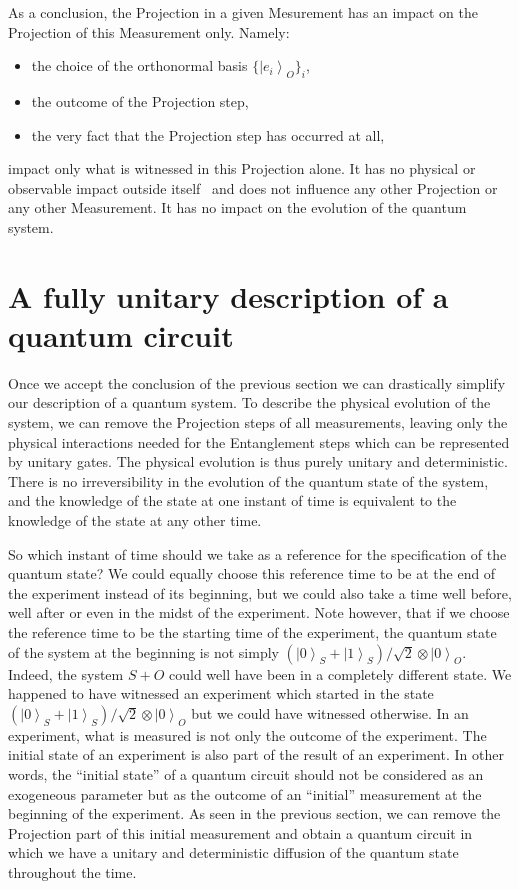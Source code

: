 \documentclass[11pt,amsmath,amssymb,latexsym,a4paper]{article}
\newcommand{\ketBasis}[2]{\left|{#1}\right>_{#2}}
\begin{document}
As a conclusion, the Projection in a given Mesurement has an impact on the Projection of this Measurement only. Namely:
\begin{itemize}
\item the choice of the orthonormal basis  $\{\ketBasis{e_i}{O}\}_i$,
\item the outcome of the Projection step,
\item the very fact that the Projection step has occurred at all,
\end{itemize}
impact only what is witnessed in this Projection alone. It has no physical or observable impact outside itself~\cite{Inamori} and does not influence any other Projection or any other Measurement. It has no impact on the evolution of the quantum system.



\section{A fully unitary description of a quantum circuit}

Once we accept the conclusion of the previous section we can drastically simplify our description of a quantum system. To describe the physical evolution of the system, we can remove the Projection steps of all measurements, leaving only the physical interactions needed for the Entanglement steps which can be represented by unitary gates. 
The physical evolution is thus purely unitary and deterministic. There is no irreversibility in the evolution of the quantum state of the system, and the knowledge of the state at one instant of time is equivalent to the knowledge of the state at any other time. 

So which instant of time should we take as a reference for the specification of the quantum state? We could equally choose this reference time to be at the end of the experiment instead of its beginning, but we could also take a time well before, well after or even in the midst of the experiment. Note however, that if we choose the reference time to be the starting time of the experiment, the quantum state of the system at the beginning is not simply $(\ketBasis{0}{S}+\ketBasis{1}{S})/\sqrt{2}\otimes\ketBasis{0}{O}$. Indeed, the system $S+O$ could well have been in a completely different state. We happened to have witnessed an experiment which started in the state $(\ketBasis{0}{S}+\ketBasis{1}{S})/\sqrt{2}\otimes\ketBasis{0}{O}$ but we could have witnessed otherwise. In an experiment, what is measured is not only the outcome of the experiment. The initial state of an experiment is also part of the result of an experiment.
In other words, the ``initial state'' of a quantum circuit should not be considered as an exogeneous parameter but as the outcome of an ``initial'' measurement at the beginning of the experiment.  As seen in the previous section, we can remove the Projection part of this initial measurement and obtain a quantum circuit in which we have a unitary and deterministic diffusion of the quantum state throughout the time. 
\end{document}
